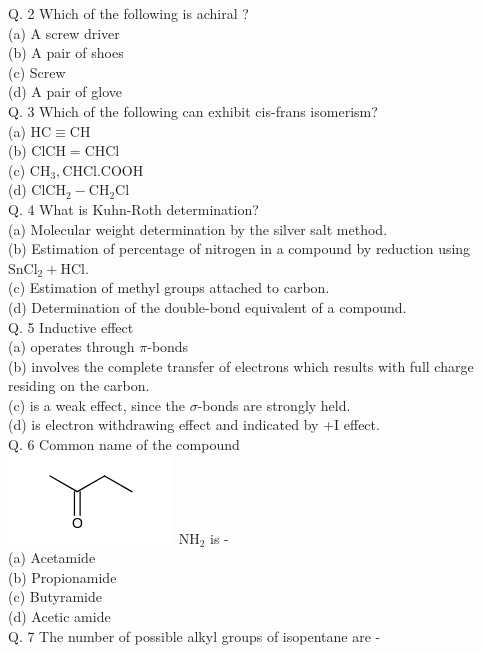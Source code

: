\documentclass[10pt]{article}
\begin{document}
Q. 2 Which of the following is achiral ?\\
(a) A screw driver\\
(b) A pair of shoes\\
(c) Screw\\
(d) A pair of glove\\
Q. 3 Which of the following can exhibit cis-frans isomerism?\\
(a) $\mathrm{HC} \equiv \mathrm{CH}$\\
(b) $\mathrm{ClCH}=\mathrm{CHCl}$\\
(c) $\mathrm{CH}_{3}, \mathrm{CHCl} . \mathrm{COOH}$\\
(d) $\mathrm{ClCH}_{2}-\mathrm{CH}_{2} \mathrm{Cl}$\\
Q. 4 What is Kuhn-Roth determination?\\
(a) Molecular weight determination by the silver salt method.\\
(b) Estimation of percentage of nitrogen in a compound by reduction using $\mathrm{SnCl}_{2}+\mathrm{HCl}$.\\
(c) Estimation of methyl groups attached to carbon.\\
(d) Determination of the double-bond equivalent of a compound.\\
Q. 5 Inductive effect\\
(a) operates through $\pi$-bonds\\
(b) involves the complete transfer of electrons which results with full charge residing on the carbon.\\
(c) is a weak effect, since the $\sigma$-bonds are strongly held.\\
(d) is electron withdrawing effect and indicated by +I effect.\\
Q. 6 Common name of the compound\\
\includegraphics{smile-23ad489f402ba7026faf0be92f4e386e8091550d} $\mathrm{NH}_{2}$ is -\\
(a) Acetamide\\
(b) Propionamide\\
(c) Butyramide\\
(d) Acetic amide\\
Q. 7 The number of possible alkyl groups of isopentane are -\\
\end{document}
